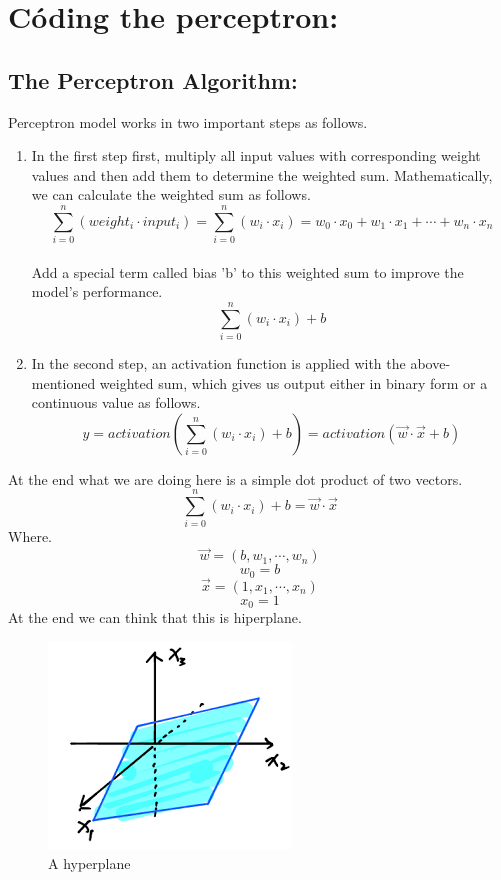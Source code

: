 \documentclass[12pt]{article}
\begin{document}
\section{Códing the perceptron:}
\subsection{The Perceptron Algorithm:}
Perceptron model works in two important steps as follows.
\begin{enumerate}
\item In the first step first, multiply all input values with corresponding weight values and then add
  them to determine the weighted sum. Mathematically, we can calculate the weighted sum as follows.\\
  \[
    \sum_{i = 0}^{n}(weight_i \cdot input_i) = \sum_{i = 0}^{n}(w_i \cdot x_i) = w_0 \cdot x_0 + w_1 \cdot x_1
    + \cdots + w_n \cdot x_n
  \]\\
  Add a special term called bias 'b' to this weighted sum to improve the model's performance.\\
  \[
    \sum_{i = 0}^{n}(w_i \cdot x_i) + b
  \]
\item In the second step, an activation function is applied with the above-mentioned weighted sum,
  which gives us output either in binary form or a continuous value as follows.\\
  \[
    y = activation(\sum_{i = 0}^{n}(w_i \cdot x_i) + b) = activation(\vec{w} \cdot \vec{x} + b)
  \]
\end{enumerate}
At the end what we are doing here is a simple dot product of two vectors.
\[
  \sum_{i = 0}^{n}(w_i \cdot x_i) + b = \vec{w} \cdot \vec{x}
\]
Where.
\[
  \vec{w} = (b, w_1, \cdots, w_n)
\]
\[
  w_0 = b
\]
\[
  \vec{x} = (1, x_1, \cdots, x_n)
\]
\[
  x_0 = 1
\]
At the end we can think that this is hiperplane.

\begin{figure}[!hb]
  \centering
  \includegraphics[scale = 1]{plane.png}
  \caption{A hyperplane}
\end{figure}
\end{document}
